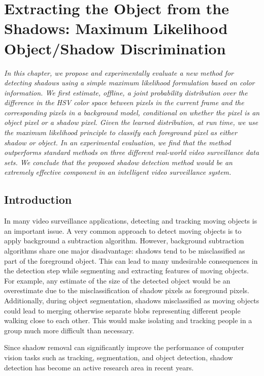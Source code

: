 \setlength{\footskip}{8mm}

\chapter{Extracting the Object from the Shadows: Maximum Likelihood
Object/Shadow Discrimination}
\label{ch:shadow}

\textit{In this chapter, we propose and experimentally evaluate a new
method for detecting shadows using a simple maximum likelihood
formulation based on color information. We first estimate, offline, a
joint probability distribution over the difference in the HSV color
space between pixels in the current frame and the corresponding pixels
in a background model, conditional on whether the pixel is an object
pixel or a shadow pixel.  Given the learned distribution, at run time,
we use the maximum likelihood principle to classify each foreground
pixel as either shadow or object.  In an experimental evaluation, we
find that the method outperforms standard methods on three different
real-world video surveillance data sets.  We conclude that the
proposed shadow detection method would be an extremely effective
component in an intelligent video surveillance system.}

\section{Introduction}

In many video surveillance applications, detecting and tracking moving
objects is an important issue. A very common approach to detect moving
objects is to apply background a subtraction algorithm. However,
background subtraction algorithms share one major disadvantage:
shadows tend to be misclassified as part of the foreground
object. This can lead to many undesirable consequences in the
detection step while segmenting and extracting features of moving
objects. For example, any estimate of the size of the detected object
would be an overestimate due to the misclassification of shadow pixels
as foreground pixels. Additionally, during object segmentation,
shadows misclassified as moving objects could lead to merging
otherwise separate blobs representing different people walking close
to each other.  This would make isolating and tracking people in a
group much more difficult than necessary.

Since shadow removal can significantly improve the performance of
computer vision tasks such as tracking, segmentation, and object
detection, shadow detection has become an active research area in
recent years.

